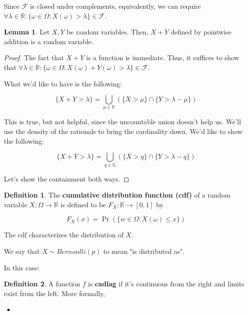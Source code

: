 \documentclass{article}
\theoremstyle{definition}
\newtheorem{definition}{Definition}
\newtheorem{lemma}[theorem]{Lemma}
\newcommand{\R}{\mathbb{R}}
\newcommand{\Q}{\mathbb{Q}}
\begin{document}
Since $\mathcal{F}$ is closed under complements, equivalently,
we can require $\forall \lambda \in \R: \{\omega \in \Omega: X(\omega) > \lambda\} \in \mathcal{F}$.

\begin{lemma}
    Let $X,Y$ be random variables. Then, $X + Y$ defined by 
    pointwise addition is a random variable.
\end{lemma}
\begin{proof}
    The fact that $X+Y$ is a function is immediate. Thus, it suffices to show that
    $\forall \lambda \in \R: \{\omega \in \Omega: X(\omega) + Y(\omega)> \lambda\} \in \mathcal{F}$.

    What we'd like to have is the following:

    \[ \{ X + Y > \lambda\} = \bigcup_{\mu \in \R}(\{X > \mu\} \cap \{Y > \lambda - \mu\}) \]

    This is true, but not helpful, since the uncountable union doesn't help us. We'll use the density
    of the rationals to bring the cardinality down. We'd like to show the following:

    \[ \{ X + Y > \lambda\} = \bigcup_{q \in \Q}(\{X > q\} \cap \{Y > \lambda - q\}) \]

    Let's show the containment both ways.

\end{proof}

\begin{definition}
    The \textbf{cumulative distribution function (cdf)} of a random variable
    $X: \Omega \xrightarrow{} \R$ is defined to be $F_{X}: \R \xrightarrow{} [0,1]$
    by

    \[ F_{X}(x) = \Pr(\{w \in \Omega: X(\omega) \leq x\})\]
\end{definition}

The cdf characterizes the distribution of $X$.

We say that $X \sim Bernoulli(p)$ to mean "is distributed as".

In this case:


\begin{definition}
    A function $f$ is \textbf{cadlag} if it's continuous from the right and limits
    exist from the left. More formally,

    \begin{itemize}
        \item 
    \end{itemize}
\end{definition}
\end{document}
